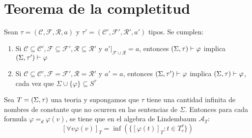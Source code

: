 
\section{Teorema de la completitud}

\begin{lemma}
  Sean $\tau=(\mathcal{C},\mathcal{F},\mathcal{R},a)$ y $\tau'=(\mathcal{C}',\mathcal{F}',\mathcal{R}',a')$ tipos. Se cumplen: \begin{enumerate}
    \item Si $\mathcal{C}\subseteq\mathcal{C}', \mathcal{F}\subseteq\mathcal{F}',\mathcal{R}\subseteq\mathcal{R}'$ y $a'|_{\mathcal{F}\cup\mathcal{R}}=a$,
    entonces $(\Sigma,\tau)\vdash\varphi$ implica $(\Sigma,\tau')\vdash\varphi$
    \item Si $\mathcal{C}\subseteq\mathcal{C}', \mathcal{F}=\mathcal{F}',\mathcal{R}=\mathcal{R}'$ y $a'=a$, entonces $(\Sigma,\tau')\vdash\varphi$
    implica $(\Sigma,\tau)\vdash\varphi$, cada vez que $\Sigma\cup\{\varphi\}\subseteq S^\tau$
  \end{enumerate} 
\end{lemma}
\noproof

\begin{lemma}
  Sea $T=(\Sigma,\tau)$ una teoria y supongamos que $\tau$ tiene una cantidad infinita de nombres de constante que no ocurren en las sentencias de $\Sigma$.
  Entonces para cada formula $\varphi=_d\varphi(v)$, se tiene que en el algebra de Lindembaum $\mathcal{A}_T$:
  $$
  [\forall v\varphi(v)]_T=\inf(\{[\varphi(t)]_T:t\in T_c^\tau\})
  $$
  
\end{lemma}

\noproof

